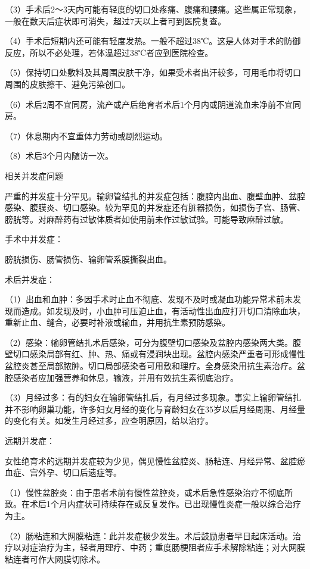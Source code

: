 \documentclass[12pt,UTF8,openany]{ctexbook}
\begin{document}
（3）手术后2～3天内可能有轻度的切口处疼痛、腹痛和腰痛。这些属正常现象，一般在数天后症状即可消失，超过7天以上者可到医院复查。

（4）手术后短期内还可能有轻度发热。一般不超过38℃。这是人体对手术的防御反应，所以不必处理，若体温超过38℃者应到医院检查。

（5）保持切口处敷料及其周围皮肤干净，如果受术者出汗较多，可用毛巾将切口周围的皮肤擦干、避免污染创口。

（6）术后2周不宜同房，流产或产后绝育者术后1个月内或阴道流血未净前不宜同房。

（7）休息期内不宜重体力劳动或剧烈运动。

（8）术后3个月内随访一次。





相关并发症问题


严重的并发症十分罕见。输卵管结扎的并发症包括：腹腔内出血、腹壁血肿、盆腔感染、腹膜炎、切口感染。较为罕见的并发症还有脏器损伤，如损伤子宫、肠管、膀胱等。对麻醉药有过敏体质者如使用前未作过敏试验。可能导致麻醉过敏。

手术中并发症：

膀胱损伤、肠管损伤、输卵管系膜撕裂出血。

术后并发症：

（1）出血和血肿：多因手术时止血不彻底、发现不及时或凝血功能异常术前未发现而造成。如发现及时，小血肿可压迫止血，有活动性出血应打开切口清除血块，重新止血、缝合，必要时补液或输血，并用抗生素预防感染。

（2）感染：输卵管结扎术后感染，可分为腹壁切口感染及盆腔内感染两大类。腹壁切口感染局部有红、肿、热、痛或有浸润块出现。盆腔内感染严重者可形成慢性盆腔炎甚至局部脓肿。切口局部感染者可用敷和理疗。全身感染用抗生素治疗。盆腔感染者应加强营养和休息，输液，并用有效抗生素彻底治疗。

（3）月经过多：有的妇女在输卵管结扎后，有月经过多现象。事实上输卵管结扎并不影响卵巢功能，许多妇女月经的变化与育龄妇女在35岁以后月经周期、月经量的变化有关。如发生月经过多，应查明原因，给以治疗。

远期并发症：

女性绝育术的远期并发症较为少见，偶见慢性盆腔炎、肠粘连、月经异常、盆腔瘀血症、宫外孕、切口后遗症等。

（1）慢性盆腔炎：由于患者术前有慢性盆腔炎，或术后急性感染治疗不彻底所致。在术后1个月内症状可持续存在或反复发作。已出现慢性炎症一般以综合治疗为主。

（2）肠粘连和大网膜粘连：此并发症极少发生。术后鼓励患者早日起床活动。治疗以对症治疗为主，轻者用理疗、中药；重度肠梗阻者应手术解除粘连；对大网膜粘连者可作大网膜切除术。
\end{document}
